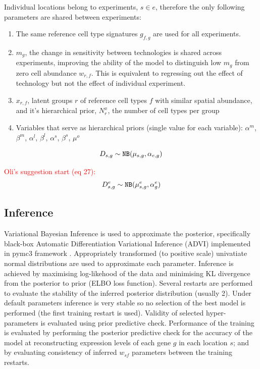 \documentclass[11pt,a4paper]{article}
\newcommand{\red}{\textcolor{red}}
\begin{document}
Individual locations belong to experiments, $s \in e$, therefore the only following parameters are shared between experiments:
\begin{enumerate}

    \item The same reference cell type signatures $g_{f,g}$ are used for all experiments.
    
    \item $m_{g}$, the change in sensitivity between technologies is shared across experiments, improving the ability of the model to distinguish low $m_{g}$ from zero cell abundance $w_{r,f}$. This is equivalent to regressing out the effect of technology but not the effect of individual experiment. 
    
    \item $x_{r,f}$, latent groups $r$ of reference cell types $f$ with similar spatial abundance, and it's hierarchical prior, $N_r^{x}$, the number of cell types per group
    
    \item Variables that serve as hierarchical priors (single value for each variable): $\alpha^m$, $\beta^m$, $\alpha^l$, $\beta^l$, $\alpha^s$, $\beta^s$, $\mu^o$
    
\end{enumerate}

\begin{equation} \label{eq:c2l:1multi}
D_{s,g} \sim \mathtt{NB}(\mu_{s,g}, \alpha_{e,g}) \\
\end{equation}

\red{\< Oli's suggestion start (eq 27):}
\begin{equation} \label{eq:c2l:1multiO}
D_{s,g}^{e} \sim \mathtt{NB}(\mu_{s,g}^{e}, \alpha_{g}^{e}) \\
\end{equation}

\subsection{Inference} \label{c2l_inference}

Variational Bayesian Inference is used to approximate the posterior, specifically black-box Automatic Differentiation Variational Inference (ADVI) implemented in pymc3 framework \cite{salvatier_probabilistic_2016}. Appropriately transformed (to positive scale) univatiate normal distributions are used to approximate each parameter. Inference is achieved by maximising log-likehood of the data and minimising KL divergence from the posterior to prior (ELBO loss function).
Several restarts are performed to evaluate the stability of the inferred posterior distribution (usually 2). Under default parameters inference is very stable so no selection of the best model is performed (the first training restart is used). Validity of selected hyper-parameters is evaluated using prior predictive check. Performance of the training is evaluated by performing the posterior predictive check for the accuracy of the model at reconstructing expression levels of each gene $g$ in each location $s$; and by evaluating consistency of inferred $w_{sf}$ parameters between the training restarts.
\end{document}
